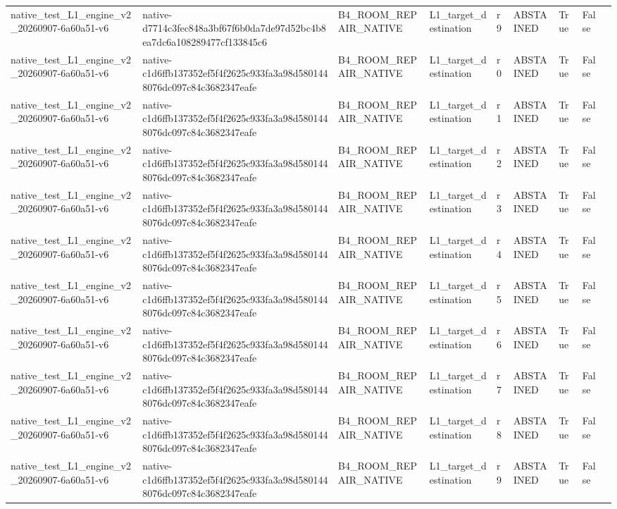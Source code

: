 \begin{tabular}{lllllllll}
native\_test\_L1\_engine\_v2\_20260907-6a60a51-v6 & native-d7714c3fec848a3bf67f6b0da7de97d52bc4b8ea7dc6a108289477cf133845c6 & B4\_ROOM\_REPAIR\_NATIVE & L1\_target\_destination & r9 & ABSTAINED & True & False &  \\
native\_test\_L1\_engine\_v2\_20260907-6a60a51-v6 & native-c1d6ffb137352ef5f4f2625c933fa3a98d5801448076dc097c84c3682347eafe & B4\_ROOM\_REPAIR\_NATIVE & L1\_target\_destination & r0 & ABSTAINED & True & False &  \\
native\_test\_L1\_engine\_v2\_20260907-6a60a51-v6 & native-c1d6ffb137352ef5f4f2625c933fa3a98d5801448076dc097c84c3682347eafe & B4\_ROOM\_REPAIR\_NATIVE & L1\_target\_destination & r1 & ABSTAINED & True & False &  \\
native\_test\_L1\_engine\_v2\_20260907-6a60a51-v6 & native-c1d6ffb137352ef5f4f2625c933fa3a98d5801448076dc097c84c3682347eafe & B4\_ROOM\_REPAIR\_NATIVE & L1\_target\_destination & r2 & ABSTAINED & True & False &  \\
native\_test\_L1\_engine\_v2\_20260907-6a60a51-v6 & native-c1d6ffb137352ef5f4f2625c933fa3a98d5801448076dc097c84c3682347eafe & B4\_ROOM\_REPAIR\_NATIVE & L1\_target\_destination & r3 & ABSTAINED & True & False &  \\
native\_test\_L1\_engine\_v2\_20260907-6a60a51-v6 & native-c1d6ffb137352ef5f4f2625c933fa3a98d5801448076dc097c84c3682347eafe & B4\_ROOM\_REPAIR\_NATIVE & L1\_target\_destination & r4 & ABSTAINED & True & False &  \\
native\_test\_L1\_engine\_v2\_20260907-6a60a51-v6 & native-c1d6ffb137352ef5f4f2625c933fa3a98d5801448076dc097c84c3682347eafe & B4\_ROOM\_REPAIR\_NATIVE & L1\_target\_destination & r5 & ABSTAINED & True & False &  \\
native\_test\_L1\_engine\_v2\_20260907-6a60a51-v6 & native-c1d6ffb137352ef5f4f2625c933fa3a98d5801448076dc097c84c3682347eafe & B4\_ROOM\_REPAIR\_NATIVE & L1\_target\_destination & r6 & ABSTAINED & True & False &  \\
native\_test\_L1\_engine\_v2\_20260907-6a60a51-v6 & native-c1d6ffb137352ef5f4f2625c933fa3a98d5801448076dc097c84c3682347eafe & B4\_ROOM\_REPAIR\_NATIVE & L1\_target\_destination & r7 & ABSTAINED & True & False &  \\
native\_test\_L1\_engine\_v2\_20260907-6a60a51-v6 & native-c1d6ffb137352ef5f4f2625c933fa3a98d5801448076dc097c84c3682347eafe & B4\_ROOM\_REPAIR\_NATIVE & L1\_target\_destination & r8 & ABSTAINED & True & False &  \\
native\_test\_L1\_engine\_v2\_20260907-6a60a51-v6 & native-c1d6ffb137352ef5f4f2625c933fa3a98d5801448076dc097c84c3682347eafe & B4\_ROOM\_REPAIR\_NATIVE & L1\_target\_destination & r9 & ABSTAINED & True & False &  \\

\end{tabular}
